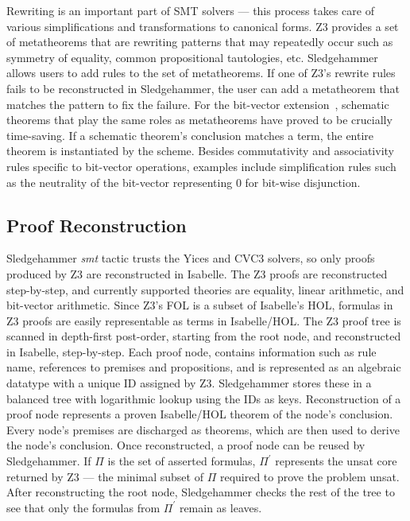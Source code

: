 \documentclass{article}
\begin{document}
		Rewriting is an important part of SMT solvers --- 
		this process takes 
		care of various simplifications and 
		transformations to canonical forms. Z3 
		provides a set of metatheorems that are 
		rewriting patterns that may repeatedly 
		occur such as symmetry of equality, common 
		propositional tautologies, etc. Sledgehammer
		allows users to add rules to the set of 
		metatheorems. If one of Z3's rewrite rules 
		fails to be reconstructed in Sledgehammer, 
		the user can add a metatheorem that 
		matches the pattern to fix the failure.
		For the bit-vector 
		extension~\cite{10.1007/978-3-642-25379-9_15}, 
		schematic theorems that play the same roles 
		as metatheorems have proved to be crucially 
		time-saving. If a schematic theorem's conclusion 
		matches a term, the entire theorem is 
		instantiated by the scheme. Besides commutativity 
		and associativity rules specific to bit-vector
		operations, examples include simplification 
		rules such as the neutrality of the bit-vector 
		representing $0$ for bit-wise disjunction.
		
	\subsection{Proof Reconstruction}
		Sledgehammer \textit{smt} tactic trusts the Yices 
		and CVC3 solvers, so only proofs produced 
		by Z3 are reconstructed in Isabelle.
		The Z3 proofs are reconstructed step-by-step,
		and currently supported theories are equality, 
		linear arithmetic, and bit-vector arithmetic.
		Since Z3's FOL is a subset of Isabelle's HOL,
		formulas in Z3 proofs are easily representable 
		as terms in Isabelle/HOL. The Z3 proof tree
		is scanned in depth-first post-order, starting 
		from the root node, and reconstructed in Isabelle,
		step-by-step. Each proof node, contains information 
		such as rule name, references to premises and 
		propositions, and is represented as an 
		algebraic datatype with a unique ID assigned
		by Z3. Sledgehammer stores these in a balanced 
		tree with logarithmic lookup using the IDs as
		keys. Reconstruction of a proof node 
		represents a proven Isabelle/HOL theorem of 
		the node's conclusion. Every node's 
		premises are discharged as theorems, which are then 
		used to derive the node's conclusion. Once 
		reconstructed, a proof node can be reused 
		by Sledgehammer. If $\Pi$ is the set of asserted 
		formulas, $\Pi^\prime$ represents the unsat 
		core returned by Z3 --- the minimal subset of 
		$\Pi$ required to prove the problem unsat. 
		After reconstructing the root node, Sledgehammer 
		checks the rest of the tree to see that only the 
		formulas from $\Pi^\prime$ remain as leaves.
		
\end{document}
